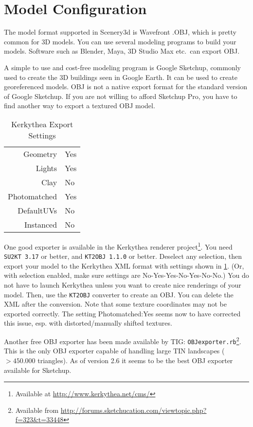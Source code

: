 \documentclass[a4paper]{article}
\newcommand{\filename}[1]{\texttt{#1}}
\begin{document}
\section{Model Configuration}
\label{sec:ModelConfiguration}

The model format supported in Scenery3d is Wavefront .OBJ, which is
pretty common for 3D models.  You can use several modeling programs to
build your models. Software such as Blender, Maya, 3D Studio
Max etc.\ can export OBJ. 

A simple to use and cost-free modeling program is Google Sketchup, commonly
used to create the 3D buildings seen in Google Earth. It can be used
to create georeferenced models.  OBJ is not a native export format for
the standard version of Google Sketchup. If you are not willing to
afford Sketchup Pro, you have to find another way to export a textured
OBJ model.


\begin{table}[t]
  \centering
\begin{tabular}{rl}
Geometry&Yes\\Lights&Yes\\Clay&No\\Photomatched&Yes\\DefaultUVs&No\\Instanced&No
\end{tabular}
\caption{Kerkythea Export Settings}
  \label{fig:KerkytheaExportSettings}
\end{table}

One good exporter is available in the Kerkythea renderer project\footnote{
Available at \url{http://www.kerkythea.net/cms/}}.  You need
\filename{SU2KT~3.17}
or better, and \filename{KT2OBJ~1.1.0} or better.  Deselect any selection, then
export your model to the Kerkythea XML format with settings shown in
\ref{fig:KerkytheaExportSettings}.
(Or, with selection enabled, make sure settings are No-Yes-Yes-No-Yes-No-No.)  
You do not have to launch Kerkythea unless you want to create nice renderings of
your model. 
Then, use the \filename{KT2OBJ} converter to create an OBJ.  You can delete the
XML after the conversion.  Note that some texture coordinates may not be
exported correctly. The setting Photomatched:Yes seems now to have
corrected this issue, esp. with distorted/manu\-ally shifted textures.

Another free OBJ exporter has been made available by 
TIG: \filename{OBJexporter.rb}\footnote{Available from
\url{http://forums.sketchucation.com/viewtopic.php?f=323&t=33448}}. 
This is the only OBJ exporter capable of handling large TIN landscapes
($>450.000$ triangles). 
As of version 2.6 it seems to be the best OBJ exporter available for Sketchup. 
\end{document}
